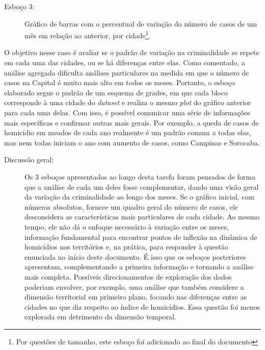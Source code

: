 \documentclass[article,12pt,openright,oneside,a4paper,brazil]{abntex2}
\begin{document}
    \begin{description}
        \item[Esboço 3:] Gráfico de barras com o percentual de variação do número de casos de um mês em relação ao anterior, por cidade\footnote{Por questões de tamanho, este esboço foi adicionado ao final do documento}.
    \end{description}

    O objetivo nesse caso é avaliar se o padrão de variação na criminalidade se repete em cada uma das cidades, ou se há diferenças entre elas. Como comentado, a análise agregada dificulta análises particulares na medida em que o número de casos na Capital é muito mais alto em todos os meses. Portanto, o esboço elaborado segue o padrão de um esquema de grades, em que cada bloco corresponde à uma cidade do \textit{dataset} e realiza o mesmo \textit{plot} do gráfico anterior para cada uma delas. Com isso, é possível comunicar uma série de informações mais específicas e confirmar outras mais gerais. Por exemplo, a queda de casos de homicídio em meados de cada ano realmente é um padrão comum a todas elas, mas nem todas iniciam o ano com aumento de casos, como Campinas e Sorocaba.

    \begin{description}
        \item[Discussão geral:] Os 3 esboços apresentados ao longo desta tarefa foram pensados de forma que a análise de cada um deles fosse complementar, dando uma visão geral da variação da criminalidade ao longo dos meses. Se o gráfico inicial, com números absolutos, fornece um quadro geral do número de casos, ele desconsidera as características mais particulares de cada cidade. Ao mesmo tempo, ele não dá o enfoque necessário à variação entre os meses, informação fundamental para encontrar pontos de inflexão na dinâmica de homicídios nos territórios e, na prática, para responder à questão enunciada no início deste documento. É isso que os esboços posteriores apresentam, complementando a primeira informação e tornando a análise mais completa. Possíveis direcionamentos de exploração dos dados poderiam envolver, por exemplo, uma análise que também considere a dimensão territorial em primeiro plano, focando nas diferenças entre as cidades no que diz respeito ao índice de homicídios. Essa questão foi menos explorada em detrimento da dimensão temporal.
    \end{description}

    \newpage
    
    

    
\end{document}
